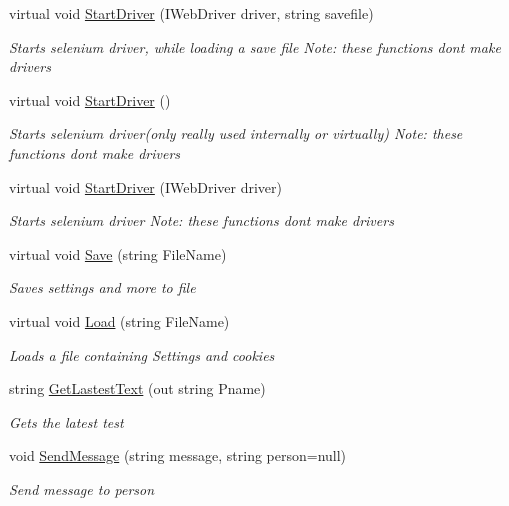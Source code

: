 \begin{DoxyCompactItemize}
virtual void \hyperlink{class_web_whatsapp_a_p_i_1_1_base_class_aaa7e5947e31c9f475c95c9818f6c3a00}{Start\+Driver} (I\+Web\+Driver driver, string savefile)
\begin{DoxyCompactList}\small\item\em Starts selenium driver, while loading a save file Note\+: these functions don\textquotesingle{}t make drivers \end{DoxyCompactList}\item 
virtual void \hyperlink{class_web_whatsapp_a_p_i_1_1_base_class_a8108d46b4176fc74fb49626e8122df88}{Start\+Driver} ()
\begin{DoxyCompactList}\small\item\em Starts selenium driver(only really used internally or virtually) Note\+: these functions don\textquotesingle{}t make drivers \end{DoxyCompactList}\item 
virtual void \hyperlink{class_web_whatsapp_a_p_i_1_1_base_class_a3a26ad50a4ba508f1162402bc00e128b}{Start\+Driver} (I\+Web\+Driver driver)
\begin{DoxyCompactList}\small\item\em Starts selenium driver Note\+: these functions don\textquotesingle{}t make drivers \end{DoxyCompactList}\item 
virtual void \hyperlink{class_web_whatsapp_a_p_i_1_1_base_class_a03ddf85cb437ebabb7f3444d856bd8a7}{Save} (string File\+Name)
\begin{DoxyCompactList}\small\item\em Saves settings and more to file \end{DoxyCompactList}\item 
virtual void \hyperlink{class_web_whatsapp_a_p_i_1_1_base_class_a6e8b8b0fbf62bffb3e153f4003280626}{Load} (string File\+Name)
\begin{DoxyCompactList}\small\item\em Loads a file containing Settings and cookies \end{DoxyCompactList}\item 
string \hyperlink{class_web_whatsapp_a_p_i_1_1_base_class_a9b62276c558e7e81cf507af854cdc0b2}{Get\+Lastest\+Text} (out string Pname)
\begin{DoxyCompactList}\small\item\em Gets the latest test \end{DoxyCompactList}\item 
void \hyperlink{class_web_whatsapp_a_p_i_1_1_base_class_a394d26a4172531e8149b5e084917dc99}{Send\+Message} (string message, string person=null)
\begin{DoxyCompactList}\small\item\em Send message to person \end{DoxyCompactList}\end{DoxyCompactItemize}
